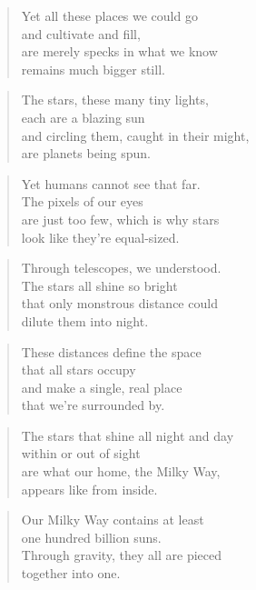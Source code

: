 \documentclass[14pt,a4paper]{article}
\begin{document}
\begin{verse}
Yet all these places we could go\\
and cultivate and fill,\\
are merely specks in what we know\\
remains much bigger still.
\end{verse}

\begin{verse}
The stars, these many tiny lights,\\
each are a blazing sun\\
and circling them, caught in their might,\\
are planets being spun.
\end{verse}

\begin{verse}
Yet humans cannot see that far.\\
The pixels of our eyes\\
are just too few, which is why stars\\
look like they’re equal-sized.
\end{verse}

\begin{verse}
Through telescopes, we understood.\\
The stars all shine so bright\\
that only monstrous distance could\\
dilute them into night.
\end{verse}

\begin{verse}
These distances define the space\\
that all stars occupy\\
and make a single, real place\\
that we’re surrounded by.
\end{verse}

\begin{verse}
The stars that shine all night and day\\
within or out of sight\\
are what our home, the Milky Way,\\
appears like from inside.
\end{verse}

\begin{verse}
Our Milky Way contains at least\\
one hundred billion suns.\\
Through gravity, they all are pieced\\
together into one.
\end{verse}
\end{document}
